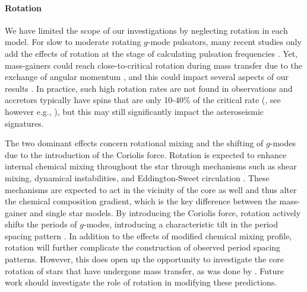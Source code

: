 \documentclass[twocolumn, twocolappendix, oneside]{aastex631}
\newcommand{\gmode}{$g$-mode\xspace}
\newcommand{\gmodes}{$g$-modes\xspace}
\begin{document}
\paragraph{Rotation} We have limited the scope of our investigations by neglecting rotation in each model. For slow to moderate rotating \gmode pulsators, many recent studies only add the effects of rotation at the stage of calculating pulsation frequencies \citep[e.g.][]{Michielsen+2021}. Yet, mass-gainers could reach close-to-critical rotation during mass transfer due to the exchange of angular momentum \citep{Packet+1981, deMink+2013:2013ApJ...764..166D, Renzo+2021}, and this could impact several aspects of our results \citep[e.g.][and references therein]{Aerts+2023:2023arXiv231108453A}. In practice, such high rotation rates are not found in observations and accretors typically have spins that are only 10-40\% of the critical rate (\citealp{Dervisoglu+2010}, see however e.g., \citealp{Zehe+2018:2018AN....339...46Z}), but this may still significantly impact the asteroseismic signatures.

The two dominant effects concern rotational mixing and the shifting of \gmodes due to the introduction of the Coriolis force. Rotation is expected to enhance internal chemical mixing throughout the star through mechanisms such as shear mixing, dynamical instabilities, and Eddington-Sweet circulation \citep{Maeder2000}. These mechanisms are expected to act in the vicinity of the core as well and thus alter the chemical composition gradient, which is the key difference between the mass-gainer and single star models. By introducing the Coriolis force, rotation actively shifts the periods of \gmodes \citep{Townsend2003}, introducing a characteristic tilt in the period spacing pattern \citep{Bouabid+2013}. In addition to the effects of modified chemical mixing profile, rotation will further complicate the construction of observed period spacing patterns. However, this does open up the opportunity to investigate the core rotation of stars that have undergone mass transfer, as was done by \citet{Guo2019}. Future work should investigate the role of rotation in modifying these predictions.
\end{document}
